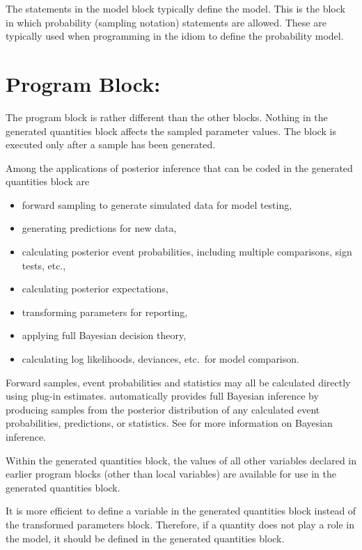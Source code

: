 The statements in the model block typically define the model.  This is
the block in which probability (sampling notation) statements are
allowed.  These are typically used when programming in the \BUGS idiom
to define the probability model.  


\section{Program Block: }

The  program block is rather different than
the other blocks.  Nothing in the generated quantities block affects
the sampled parameter values.  The block is executed only after a
sample has been generated.  

Among the applications of posterior inference that can be coded in the
generated quantities block are
%
\begin{itemize}
\item forward sampling to generate simulated data for model testing,
\item generating predictions for new data,
\item calculating posterior event probabilities, including multiple comparisons,
  sign tests, etc.,
\item calculating posterior expectations,
\item transforming parameters for reporting,
\item applying full Bayesian decision theory,
\item calculating log likelihoods, deviances, etc.\ for model comparison.
\end{itemize}
%
Forward samples, event probabilities and statistics may all be
calculated directly using plug-in estimates.  \Stan automatically
provides full Bayesian inference by producing samples from the
posterior distribution of any calculated event probabilities,
predictions, or statistics.  See  for more
information on Bayesian inference.

Within the generated quantities block, the values of all other variables
declared in earlier program blocks (other than local variables) are
available for use in the generated quantities block.

It is more efficient to define a variable in the generated quantities
block instead of the transformed parameters block.  Therefore, if a
quantity does not play a role in the model, it should be defined in
the generated quantities block.  

